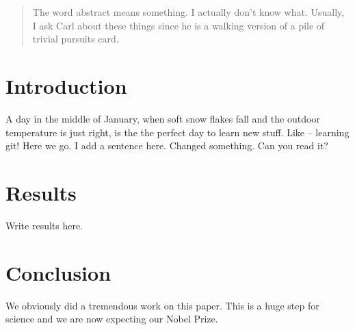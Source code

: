 \documentclass{article}
\begin{document}
\begin{abstract}
The word abstract means something. I actually don't know what.
Usually, I ask Carl about these things since he is a walking version
of a pile of trivial pursuits card.

\end{abstract}

\section{Introduction}

A day in the middle of January, when soft snow flakes fall and the outdoor temperature is just right, is the the perfect day to learn new stuff. 
Like -- learning git! Here we go. I add a sentence here. 
Changed something. Can you read it?
\section{Results}

Write results here.

\section{Conclusion}

We obviously did a tremendous work on this paper. This is a huge step for science and we are now expecting our Nobel Prize.
\end{document}
